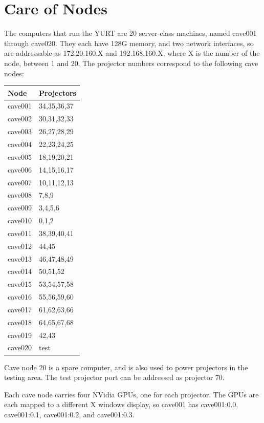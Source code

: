 \documentclass[11pt]{article}
\newcommand{\yurt}{YURT\xspace}
\begin{document}
\section{Care of Nodes}

The computers that run the \yurt are 20 server-class machines, named
cave001 through cave020.  They each have 128G memory, and two network
interfaces, so are addressable as 172.20.160.X and 192.168.160.X,
where X is the number of the node, between 1 and 20.  The projector
numbers correspond to the following cave nodes:

\begin{center}
\begin{tabular}{ll}
\textbf{Node} & \textbf{Projectors} \\ \hline
cave001 & 34,35,36,37 \\
cave002 & 30,31,32,33 \\
cave003 & 26,27,28,29 \\
cave004 & 22,23,24,25 \\
cave005 & 18,19,20,21 \\
cave006 & 14,15,16,17 \\
cave007 & 10,11,12,13 \\
cave008 & 7,8,9 \\
cave009 & 3,4,5,6 \\
cave010 & 0,1,2 \\
cave011 & 38,39,40,41 \\
cave012 & 44,45 \\
cave013 & 46,47,48,49 \\
cave014 & 50,51,52 \\
cave015 & 53,54,57,58 \\
cave016 & 55,56,59,60 \\
cave017 & 61,62,63,66 \\
cave018 & 64,65,67,68 \\
cave019 & 42,43 \\
cave020 & test \\
\end{tabular}
\end{center}

Cave node 20 is a spare computer, and is also used to power projectors
in the testing area.  The test projector port can be addressed as
projector 70.

Each cave node carries four NVidia GPUs, one for each projector.  The
GPUs are each mapped to a different X windows display, so cave001 has
cave001:0.0, cave001:0.1, cave001:0.2, and cave001:0.3.
\end{document}
